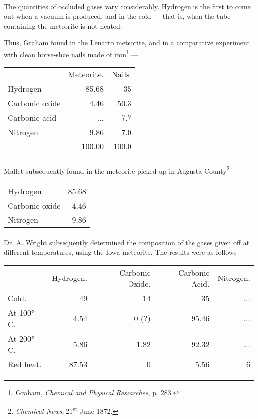 \documentclass[a4paper, 12pt, oneside, polutonikogreek, english]{article}
\begin{document}
\paragraph{}
The quantities of occluded gases vary considerably. Hydrogen is the first to come out when a vacuum is produced, and in the cold --- that is, when the tube containing the meteorite is not heated.

Thus, Graham found in the Lenarto meteorite, and in a comparative experiment with clean horse-shoe nails made of iron\footnote{Graham, \emph{Chemical and Physical Researches}, p. 283.} ---
\begin{table}[H]
    \centering
    \begin{tabular}{l r r}
        ~ & Meteorite. & Nails.  \\ 
        Hydrogen & 85.68 & 35 \\ 
        Carbonic oxide & 4.46 & 50.3 \\ 
        Carbonic acid & ... & 7.7 \\ 
        Nitrogen & 9.86 & 7.0 \\ \hline
        ~ & 100.00 & 100.0 \\ 
    \end{tabular}
\end{table}
\paragraph{}
Mallet subsequently found in the meteorite picked up in Augusta County\footnote{\emph{Chemical News}, 21\textsuperscript{st} June 1872.} ---
\begin{table}[H]
    \centering
    \begin{tabular}{l r}
        Hydrogen & 85.68 \\ 
        Carbonic oxide & 4.46 \\ 
        Nitrogen & 9.86 \\ 
    \end{tabular}
\end{table}
\paragraph{}
Dr. A. Wright subsequently determined the composition of the gases given off at different temperatures, using the Iowa meteorite. The results were as follows ---
\begin{table}[H]
    \centering
    \begin{tabular}{lrrrr}
        ~ & Hydrogen. & Carbonic Oxide. & Carbonic Acid. & Nitrogen.  \\ 
        Cold. & 49 & 14 & 35 & ...  \\ 
        At 100° C. & 4.54 & 0 (?) & 95.46 & ...  \\ 
        At 200° C. & 5.86 & 1.82 & 92.32 & ...  \\ 
        Red heat. & 87.53 & 0 & 5.56 & 6 \\ 
    \end{tabular}
\end{table}
\end{document}
